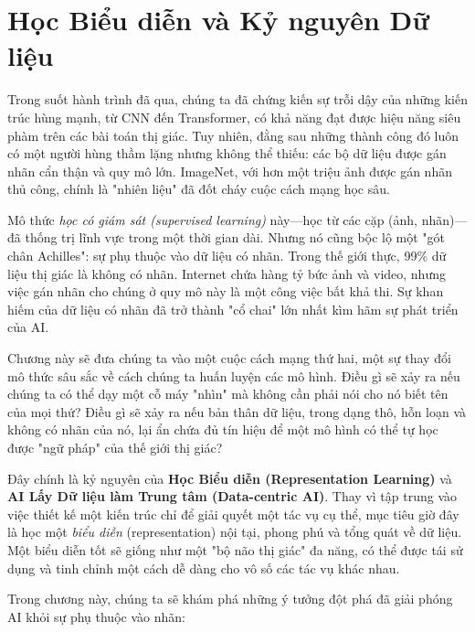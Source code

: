 \chapter{Học Biểu diễn và Kỷ nguyên Dữ liệu}
\label{chap:representation_learning}

Trong suốt hành trình đã qua, chúng ta đã chứng kiến sự trỗi dậy của những kiến trúc hùng mạnh, từ CNN đến Transformer, có khả năng đạt được hiệu năng siêu phàm trên các bài toán thị giác. Tuy nhiên, đằng sau những thành công đó luôn có một người hùng thầm lặng nhưng không thể thiếu: các bộ dữ liệu được gán nhãn cẩn thận và quy mô lớn. ImageNet, với hơn một triệu ảnh được gán nhãn thủ công, chính là "nhiên liệu" đã đốt cháy cuộc cách mạng học sâu.

Mô thức \textit{học có giám sát (supervised learning)} này—học từ các cặp (ảnh, nhãn)—đã thống trị lĩnh vực trong một thời gian dài. Nhưng nó cũng bộc lộ một "gót chân Achilles": sự phụ thuộc vào dữ liệu có nhãn. Trong thế giới thực, 99\% dữ liệu thị giác là không có nhãn. Internet chứa hàng tỷ bức ảnh và video, nhưng việc gán nhãn cho chúng ở quy mô này là một công việc bất khả thi. Sự khan hiếm của dữ liệu có nhãn đã trở thành "cổ chai" lớn nhất kìm hãm sự phát triển của AI.

Chương này sẽ đưa chúng ta vào một cuộc cách mạng thứ hai, một sự thay đổi mô thức sâu sắc về cách chúng ta huấn luyện các mô hình. Điều gì sẽ xảy ra nếu chúng ta có thể dạy một cỗ máy "nhìn" mà không cần phải nói cho nó biết tên của mọi thứ? Điều gì sẽ xảy ra nếu bản thân dữ liệu, trong dạng thô, hỗn loạn và không có nhãn của nó, lại ẩn chứa đủ tín hiệu để một mô hình có thể tự học được "ngữ pháp" của thế giới thị giác?

Đây chính là kỷ nguyên của \textbf{Học Biểu diễn (Representation Learning)} và \textbf{AI Lấy Dữ liệu làm Trung tâm (Data-centric AI)}. Thay vì tập trung vào việc thiết kế một kiến trúc chỉ để giải quyết một tác vụ cụ thể, mục tiêu giờ đây là học một \textit{biểu diễn} (representation) nội tại, phong phú và tổng quát về dữ liệu. Một biểu diễn tốt sẽ giống như một "bộ não thị giác" đa năng, có thể được tái sử dụng và tinh chỉnh một cách dễ dàng cho vô số các tác vụ khác nhau.

Trong chương này, chúng ta sẽ khám phá những ý tưởng đột phá đã giải phóng AI khỏi sự phụ thuộc vào nhãn:

